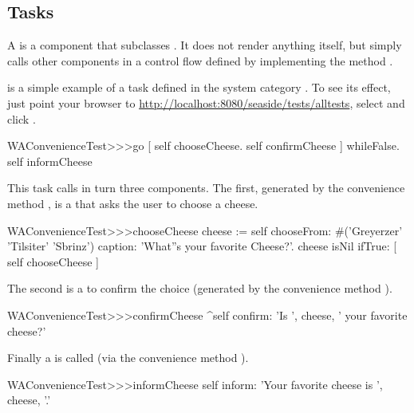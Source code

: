 \documentclass[a4paper,10pt,twoside]{book}
\begin{document}
\subsection{Tasks}

A  is a component that subclasses .
It does not render anything itself, but simply calls other components in a control flow defined by implementing the method .

 is a simple example of a task defined in the system category .
To see its effect, just point your browser to \url{http://localhost:8080/seaside/tests/alltests}, select  and click .

\begin{code}{}
WAConvenienceTest>>>go
	[ self chooseCheese.
	  self confirmCheese ] whileFalse.
	self informCheese
\end{code}

This task calls in turn three components.
The first, generated by the convenience method , is a  that asks the user to choose a cheese.

\begin{code}{}
WAConvenienceTest>>>chooseCheese
	cheese := self
		chooseFrom: #('Greyerzer' 'Tilsiter' 'Sbrinz')
		caption: 'What''s your favorite Cheese?'.
	cheese isNil ifTrue: [ self chooseCheese ]
\end{code}


The second is a  to confirm the choice (generated by the convenience method ).

\begin{code}{}
WAConvenienceTest>>>confirmCheese
	^self confirm: 'Is ', cheese,  ' your favorite cheese?'
\end{code}

Finally a  is called (via the convenience method ).

\begin{code}{}
WAConvenienceTest>>>informCheese
	self inform: 'Your favorite cheese is ', cheese, '.'
\end{code}
\end{document}
